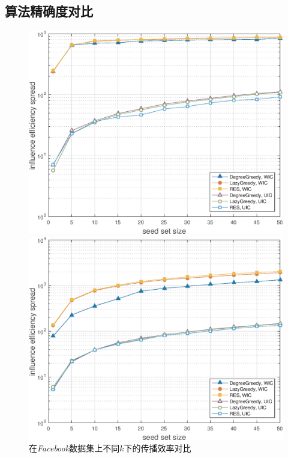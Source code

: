 \subsection{算法精确度对比}
\label{subsec:accuracy}
\begin{figure}[!ht]
   \begin{minipage}{0.48\textwidth}
     \centering
     \includegraphics[width=\linewidth]{figures/facebookEff.eps}
     \caption{在\textit{Facebook}数据集上不同$k$下的传播效率对比}
     \label{fig:facebookEff}
   \end{minipage}
   \hfill
   \begin {minipage}{0.48\textwidth}
     \centering
     \includegraphics[width=\linewidth]{figures/hepPhEff.eps}

\end{minipage}
\end{figure}
